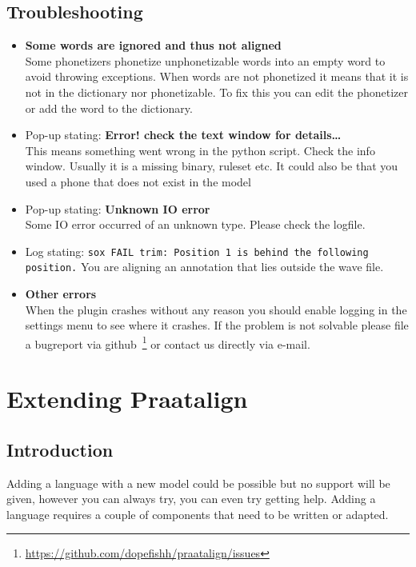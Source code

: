 \section{Troubleshooting}
\begin{itemize}
	\item \textbf{Some words are ignored and thus not aligned}\\
		Some phonetizers phonetize unphonetizable words into an empty word to avoid
		throwing exceptions. When words are not phonetized it means that it is not
		in the dictionary nor phonetizable. To fix this you can edit the phonetizer
		or add the word to the dictionary.
	\item Pop-up stating: \textbf{Error! check the text window for details\ldots}\\
		This means something went wrong in the python script. Check the info
		window. Usually it is a missing binary, ruleset etc. It could also be
		that you used a phone that does not exist in the model
	\item Pop-up stating: \textbf{Unknown IO error}\\
		Some IO error occurred of an unknown type. Please check the logfile.
	\item Log stating: \texttt{sox FAIL trim: Position 1 is behind the
		following position.}
		You are aligning an annotation that lies outside the wave file.
	\item \textbf{Other errors}\\
		When the plugin crashes without any reason you should enable logging in the
		settings menu to see where it crashes. If the problem is not solvable
		please file a bugreport via
		github~\footnote{\url{https://github.com/dopefishh/praatalign/issues}} or
		contact us directly via e-mail.
\end{itemize}

\chapter{Extending Praatalign}
\section{Introduction}
Adding a language with a new model could be possible but no support will be
given, however you can always try, you can even try getting help. Adding a
language requires a couple of components that need to be written or adapted.

